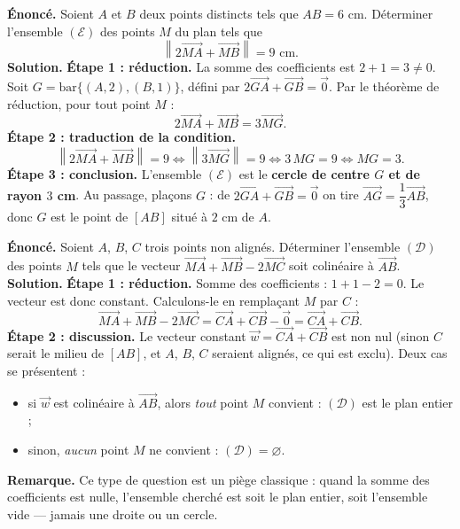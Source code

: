 \documentclass[11pt]{article}
\begin{document}
\begin{exoresolu}
\textbf{Énoncé.} Soient $A$ et $B$ deux points distincts tels que $AB = 6$ cm. Déterminer l'ensemble $(\mathcal{E})$ des points $M$ du plan tels que
\[
\left\| 2\overrightarrow{MA} + \overrightarrow{MB} \right\| = 9 \text{ cm}.
\]
\tcblower
\textbf{Solution.} \textbf{Étape 1 : réduction.} La somme des coefficients est $2 + 1 = 3 \neq 0$. Soit $G = \mathrm{bar}\{(A,2), (B,1)\}$, défini par $2\overrightarrow{GA} + \overrightarrow{GB} = \vec{0}$. Par le théorème de réduction, pour tout point $M$ :
\[
2\overrightarrow{MA} + \overrightarrow{MB} = 3\overrightarrow{MG}.
\]
\textbf{Étape 2 : traduction de la condition.}
\[
\left\| 2\overrightarrow{MA} + \overrightarrow{MB} \right\| = 9 \iff \left\| 3\overrightarrow{MG} \right\| = 9 \iff 3\,MG = 9 \iff MG = 3.
\]
\textbf{Étape 3 : conclusion.} L'ensemble $(\mathcal{E})$ est le \textbf{cercle de centre $G$ et de rayon $3$ cm}. Au passage, plaçons $G$ : de $2\overrightarrow{GA} + \overrightarrow{GB} = \vec{0}$ on tire $\overrightarrow{AG} = \dfrac{1}{3}\overrightarrow{AB}$, donc $G$ est le point de $[AB]$ situé à $2$ cm de $A$.
\end{exoresolu}

\begin{exoresolu}
\textbf{Énoncé.} Soient $A$, $B$, $C$ trois points non alignés. Déterminer l'ensemble $(\mathcal{D})$ des points $M$ tels que le vecteur $\overrightarrow{MA} + \overrightarrow{MB} - 2\overrightarrow{MC}$ soit colinéaire à $\overrightarrow{AB}$.
\tcblower
\textbf{Solution.} \textbf{Étape 1 : réduction.} Somme des coefficients : $1 + 1 - 2 = 0$. Le vecteur est donc constant. Calculons-le en remplaçant $M$ par $C$ :
\[
\overrightarrow{MA} + \overrightarrow{MB} - 2\overrightarrow{MC} = \overrightarrow{CA} + \overrightarrow{CB} - \vec{0} = \overrightarrow{CA} + \overrightarrow{CB}.
\]
\textbf{Étape 2 : discussion.} Le vecteur constant $\vec{w} = \overrightarrow{CA} + \overrightarrow{CB}$ est non nul (sinon $C$ serait le milieu de $[AB]$, et $A$, $B$, $C$ seraient alignés, ce qui est exclu). Deux cas se présentent :
\begin{itemize}
\item si $\vec{w}$ est colinéaire à $\overrightarrow{AB}$, alors \emph{tout} point $M$ convient : $(\mathcal{D})$ est le plan entier ;
\item sinon, \emph{aucun} point $M$ ne convient : $(\mathcal{D}) = \varnothing$.
\end{itemize}
\textbf{Remarque.} Ce type de question est un piège classique : quand la somme des coefficients est nulle, l'ensemble cherché est soit le plan entier, soit l'ensemble vide — jamais une droite ou un cercle.
\end{exoresolu}
\end{document}
